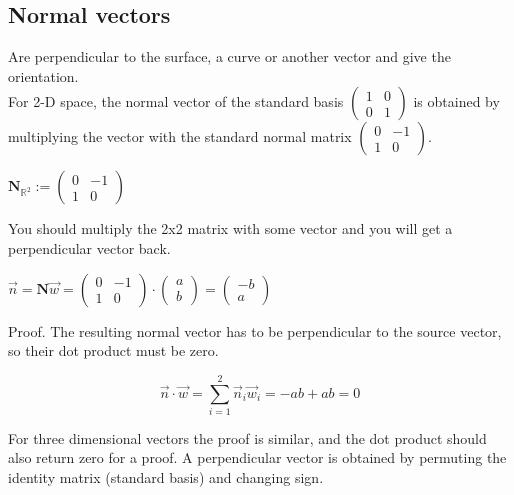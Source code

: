 \documentclass[a4paper]{article}
\begin{document}
\begin{Example}
\subsection{Normal vectors}

Are perpendicular to the surface, a curve or another vector and give the orientation.\\

For 2-D space, the normal vector of the standard basis $\begin{pmatrix}1&0\\0&1\end{pmatrix}$ is obtained by multiplying the vector with the standard normal matrix $\begin{pmatrix}0 & -1 \\ 1 & 0\end{pmatrix}$.\\

\begin{center}
$\boldsymbol{N}_{\mathbb{R}^{2}} := \begin{pmatrix}0 & -1 \\ 1 & 0\end{pmatrix}$\\
\end{center}

You should multiply the 2x2 matrix with some vector and you will get a perpendicular vector back.

\begin{center}
$\vec{n} = \boldsymbol{N}\vec{w} = \begin{pmatrix}0 & -1 \\ 1 & 0\end{pmatrix} \cdot \begin{pmatrix}a\\b\end{pmatrix} = \begin{pmatrix}-b\\a\end{pmatrix}$
\end{center}

Proof. The resulting normal vector has to be perpendicular to the source vector, so their dot product must be zero.

\begin{displaymath}
\vec{n} \cdot \vec{w} = \sum_{i=1}^{2}\vec{n}_{i}\vec{w}_i = -ab + ab = 0
\end{displaymath}

For three dimensional vectors the proof is similar, and the dot product should also return zero for a proof. A perpendicular vector is obtained by permuting the identity matrix (standard basis) and changing sign.






\end{Example}
\end{document}
